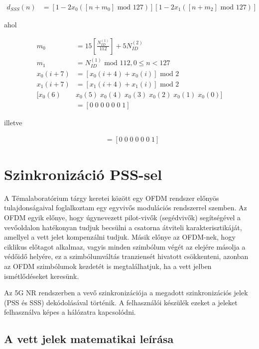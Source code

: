 \begin{align}
    d_{SSS}(n) &= [1 - 2 x_0 ([n + m_0] \text{ mod } 127)][1 - 2 x_1 ([n + m_2] \text{ mod } 127)]
\end{align}

ahol

\begin{align}
    m_0 &= 15[\frac{N_{ID}^{(1)}}{112}] + 5 N_{ID}^{(2)}\\
    m_1 &= N_{ID}^{(1)}  \text{ mod } 112, 0 \leq n < 127\\
    x_0 (i + 7) &= [x_0 (i + 4) + x_0 (i)] \text{ mod } 2\\
    x_1 (i + 7) &= [x_1 (i + 4) + x_1 (i)] \text{ mod } 2\\
    [x_0(6) \; &x_0(5) \;  x_0(4) \;  x_0(3) \;  x_0(2) \;  x_0(1)  \; x_0(0) ]\\
     &= [0 \;  0 \;  0 \;  0  \; 0  \; 0 \;  1] 
\end{align}

illetve

\begin{align}
    [x_1(6) \;x_1(5)\; x_1(4)\; x_1(3)\; x_1(2)\; x_1(1)\; x_1(0) ] &= [0\; 0\; 0\; 0\; 0\; 0\; 1]
\end{align}

\section{Szinkronizáció PSS-sel}

A Témalaboratórium tárgy keretei között egy OFDM rendszer előnyös tulajdonságaival foglalkoztam egy egyvivős modulációs rendszerrel szemben.
Az OFDM egyik előnye, hogy úgynevezett pilot-vivők (segédvivők) segítségével a vevőoldalon hatékonyan tudjuk becsülni a csatorna átviteli karakterisztikáját, amellyel a vett jelet kompenzálni tudjuk.
Másik előnye az OFDM-nek, hogy ciklikus előtagot alkalmaz, vagyis minden szimbólum végét az elejére másolja a védőidő helyére, ez a szimbólumváltás tranziensét hivatott csökkenteni, azonban az OFDM szimbólumok kezdetét is megtalálhatjuk, ha a vett jelben ismétlődéseket keresünk.

Az 5G NR rendszerben a vevő szinkronizációja a megadott szinkronizációs jelek (PSS és SSS) dekódolásával történik.
A felhasználói készülék ezeket a jeleket felhasználva képes a hálózatra kapcsolódni.

\subsection{A vett jelek matematikai leírása}

